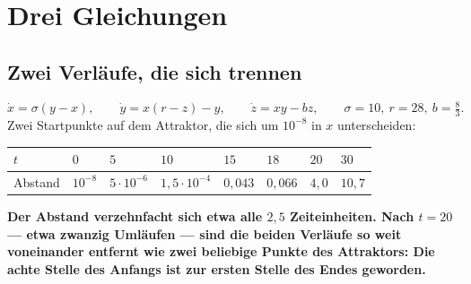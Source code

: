 \chapter{Drei Gleichungen}

\section{Zwei Verläufe, die sich trennen}

\begin{merksatz}
\[ \dot x = \sigma(y - x), \qquad \dot y = x(r - z) - y, \qquad \dot z = xy - bz, \qquad \sigma = 10,\ r = 28,\ b = \tfrac83 . \]
Zwei Startpunkte auf dem Attraktor, die sich um $10^{-8}$ in $x$ unterscheiden:

\begin{center}
{\small
\renewcommand{\arraystretch}{1.46}
\begin{tabular}{@{}P{1.3cm}P{0.9cm}P{1.0cm}P{1.2cm}P{1.0cm}P{1.0cm}P{0.9cm}P{0.9cm}@{}}
\toprule
$t$ & $0$ & $5$ & $10$ & $15$ & $18$ & $20$ & $30$\\
\midrule
Abstand & $10^{-8}$ & $5\cdot10^{-6}$ & $1{,}5\cdot10^{-4}$ & $0{,}043$ & $0{,}066$ & $4{,}0$ & $10{,}7$\\
\bottomrule
\end{tabular}}
\end{center}

\begin{center}
\begin{minipage}{0.9\textwidth}
\textbf{Der Abstand verzehnfacht sich etwa alle $2{,}5$ Zeiteinheiten. Nach $t = 20$ --- etwa zwanzig Umläufen --- sind die beiden Verläufe so weit voneinander entfernt wie zwei beliebige Punkte des Attraktors: Die achte Stelle des Anfangs ist zur ersten Stelle des Endes geworden.}
\end{minipage}
\end{center}

\begin{center}
\begin{minipage}{0.88\textwidth}
\end{minipage}
\end{center}
\end{merksatz}

